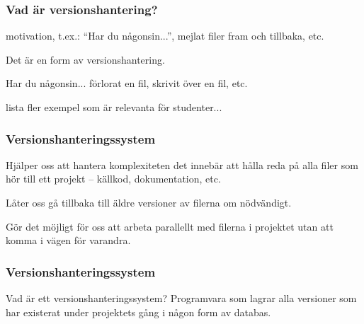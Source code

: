 

\begin{frame}
    \frametitle{Vad är versionshantering?}
    
    motivation, t.ex.: ``Har du någonsin...'', mejlat filer fram och tillbaka, etc.
    
    Det är en form av versionshantering.
    
    Har du någonsin...
    förlorat en fil, skrivit över en fil, etc.
    
    lista fler exempel som är relevanta för studenter...
    
\end{frame}
    \frametitle{Versionshanteringssystem}
    
    \begin{frame}
    Hjälper oss att hantera komplexiteten det innebär att hålla reda på alla filer som hör till ett projekt -- källkod, dokumentation, etc.

    \blankline
    Låter oss gå tillbaka till äldre versioner av filerna om nödvändigt.

    \blankline
    Gör det möjligt för oss att arbeta parallellt med filerna i projektet utan att komma i vägen för varandra.
\end{frame}

\begin{frame}
    \frametitle{Versionshanteringssystem}
    
    \begin{block}{Vad är ett versionshanteringssystem?}
        Programvara som lagrar alla versioner som har existerat under projektets gång i någon form av databas.
    \end{block}
    
\end{frame}


